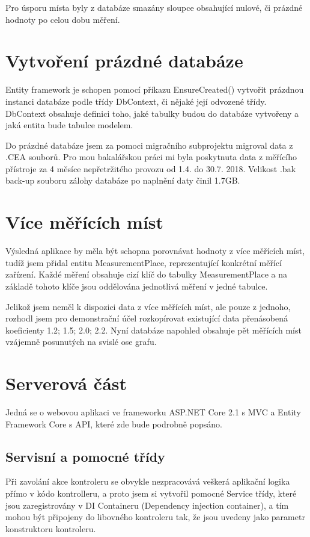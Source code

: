 \documentclass[FM,BP]{tulthesis}
\begin{document}
        Pro úsporu místa byly z databáze smazány sloupce obsahující nulové, či prázdné hodnoty po celou dobu měření.


    \section{Vytvoření prázdné databáze}
        Entity framework je schopen pomocí příkazu EnsureCreated() vytvořit prázdnou instanci databáze podle třídy DbContext, či nějaké její odvozené třídy. 
        DbContext obsahuje definici toho, jaké tabulky budou do databáze vytvořeny a jaká entita bude tabulce modelem.

        Do prázdné databáze jsem za pomoci migračního subprojektu migroval data z .CEA souborů. 
        Pro mou bakalářskou práci mi byla poskytnuta data z měřícího přístroje za 4 měsíce nepřetržitého provozu od 1.4. do 30.7. 2018.
        Velikost .bak back-up souboru zálohy databáze po naplnění daty činil 1.7GB.        

    \section{Více měřících míst}
        Výsledná aplikace by měla být schopna porovnávat hodnoty z více měřících míst, tudíž jsem přidal entitu MeasurementPlace, reprezentující konkrétní měřící zařízení. 
        Každé měření obsahuje cizí klíč do tabulky MeasurementPlace a na základě tohoto klíče jsou oddělována jednotlivá měření v jedné tabulce.

        Jelikož jsem neměl k dispozici data z více měřících míst, ale pouze z jednoho,
        rozhodl jsem pro demonstrační účel rozkopírovat existující data přenásobená koeficienty 1.2; 1.5; 2.0; 2.2.
        Nyní databáze napohled obsahuje pět měřících míst vzájemně posunutých na svislé ose grafu.

    \section{Serverová část}
        Jedná se o webovou aplikaci ve frameworku ASP.NET Core 2.1 s MVC a Entity Framework Core s API, které zde bude podrobně popsáno.

    \subsection{Servisní a pomocné třídy}
        Při zavolání akce kontroleru se obvykle nezpracovává veškerá aplikační logika přímo v kódo kontrolleru, a proto jsem si vytvořil pomocné Service třídy, které jsou zaregistrovány
        v DI Containeru (Dependency injection container), a tím mohou být připojeny do libovného kontroleru tak, že jsou uvedeny jako parametr konstruktoru kontroleru. 
\end{document}
